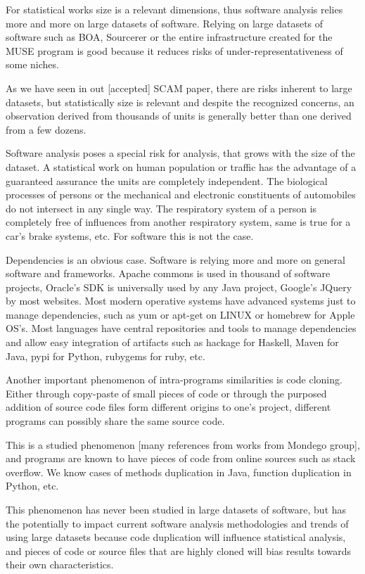 
For statistical works size is a relevant dimensions, thus software analysis relies more and more on large datasets of software.
Relying on large datasets of software such as BOA, Sourcerer or the entire infrastructure created
for the MUSE program is good because it reduces risks of under-representativeness of some niches.

As we have seen in out [accepted] SCAM paper, there are risks inherent to large datasets, but statistically
size is relevant and despite the recognized concerns, an observation derived from thousands of units is generally
better than one derived from a few dozens.

Software analysis poses a special risk for analysis, that grows with the size of the dataset. A statistical work on
human population or traffic has the advantage of a guaranteed assurance the units are completely independent. The biological
processes of persons or the mechanical and electronic constituents of automobiles do not intersect in any single way.
The respiratory system of a person is completely free of influences from another respiratory system, same is
true for a car's brake systems, etc.  For software this is not the case.

Dependencies is an obvious case. Software is relying more and more on general software and frameworks. Apache commons is
used in thousand of software projects, Oracle's SDK is universally used by any Java project, Google's JQuery by most websites.
Most modern operative systems have advanced systems just to manage dependencies, such as yum or apt-get on LINUX or homebrew
for Apple OS's. Most languages have central repositories and tools to manage dependencies and allow easy integration of artifacts such as
hackage for Haskell, Maven for Java, pypi for Python, rubygems for ruby, etc.

Another important phenomenon of intra-programs similarities is code cloning. Either through copy-paste of small pieces of code or through the
purposed addition of source code files form different origins to one's project, different programs can possibly share the same source code.

This is a studied phenomenon [many references from works from Mondego group], and programs are known to have pieces of code from
online sources such as stack overflow. We know cases of methods duplication in Java, function duplication in Python, etc.

This phenomenon has never been studied in large datasets of software, but has the potentially to impact current software analysis methodologies and
trends of using large datasets because code duplication will influence statistical analysis, and pieces of code or source files that are highly cloned
will bias results towards their own characteristics.

